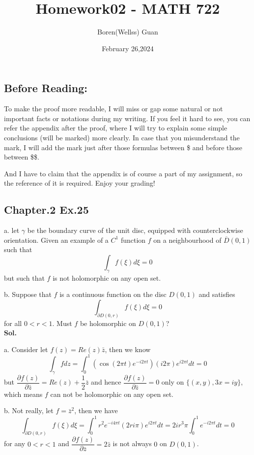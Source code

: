\documentclass[lang=en,11pt,a4paper,citestyle =authoryear]{elegantpaper}
\title{Homework02 - MATH 722}
\author{Boren(Wellss) Guan}
\date{February 26,2024}
\begin{document}
\maketitle

\subsection*{Before Reading:}\par
To make the proof more readable, I will miss or gap some natural or not important facts or notations during my writing. If you feel it hard to see, you can refer the appendix after the proof, where I will try to explain some simple conclusions (will be marked) more clearly. In case that you misunderstand the mark, I will add the mark just after those formulas between \$ and before those between \$\$.\par
And I have to claim that the appendix is of course a part of my assignment, so the reference of it is required. Enjoy your grading!

\subsection*{Chapter.2 Ex.25} 
a. let $\gamma$ be the boundary curve of the unit disc, equipped with counterclockwise orientation. Given an example of a $C^1$ function $f$ on a neighbourhood of $\overline{D}(0,1)$ such that
\[ \int_{\gamma} f(\xi)d\xi = 0\]
but such that $f$ is not holomorphic on any open set.\par
b. Suppose that $f$ is a continuous function on the disc $D(0,1)$ and satisfies
\[\int_{\partial D(0,r)} f(\xi)d\xi = 0\]
for all $0<r<1$. Must $f$ be holomorphic on $D(0,1)$?\vspace{0.5em}\\
\textbf{Sol.} \par
a. Consider let $f(z) = Re(z)\bar{z}$, then we know
\[
\int_{\gamma} fdz = \int_0^1 (\cos(2\pi t)e^{-i2\pi t})(i2\pi)e^{i2\pi t} dt = 0
\]
but $\dfrac{\partial f(z)}{\partial \bar{z}} = Re(z) + \dfrac{1}{2}\bar{z}$ and hence $\dfrac{\partial f(z)}{\partial \bar{z}} = 0$ only on $\{(x,y), 3x = iy\}$, which means $f$ can not be holomorphic on any open set.
\par
b. Not really, let $f = \bar{z}^2$, then we have
\[
\int_{\partial D(0,r)} f(\xi) d\xi = \int_0^1 r^2e^{-i4\pi t}(2ri\pi)e^{i2\pi t} dt = 2ir^3\pi \int_0^1 e^{-i2\pi t} dt = 0
\]
for any $0< r < 1$ and $\dfrac{\partial f(z)}{\partial \bar{z}} = 2\bar{z}$ is not always $0$ on $D(0,1)$.
\vspace{0.5em}
\end{document}
